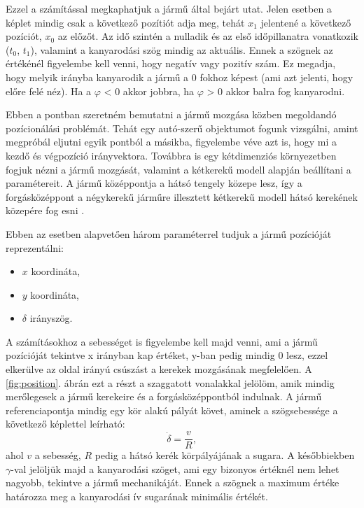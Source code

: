 Ezzel a számítással megkaphatjuk a jármű által bejárt utat. Jelen esetben a képlet mindig csak a következő pozítiót adja meg, tehát $x_1$ jelentené a következő pozíciót, $x_0$ az előzőt. Az idő szintén a nulladik és az első időpillanatra vonatkozik ($t_0$, $t_1$), valamint a kanyarodási szög mindig az aktuális. Ennek a szögnek az értékénél figyelembe kell venni, hogy negatív vagy pozitív szám. Ez megadja, hogy melyik irányba kanyarodik a jármű a 0 fokhoz képest (ami azt jelenti, hogy előre felé néz). Ha a $\varphi$ < 0 akkor jobbra, ha $\varphi$ > 0  akkor balra fog kanyarodni.


Ebben a pontban szeretném bemutatni a jármű mozgása közben megoldandó pozícionálási problémát. Tehát egy autó-szerű objektumot fogunk vizsgálni, amint megpróbál eljutni egyik pontból a másikba, figyelembe véve azt is, hogy mi a kezdő és végpozíció irányvektora. Továbbra is egy kétdimenziós környezetben fogjuk nézni a jármű mozgását, valamint a kétkerekű modell alapján beállítani a paramétereit. A jármű középpontja a hátsó tengely közepe lesz, így a forgásközéppont a négykerekű járműre illesztett kétkerekű modell hátsó kerekének közepére fog esni \cite{jazar2014steering,maalouf2006higher}.

Ebben az esetben alapvetően három paraméterrel tudjuk a jármű pozícióját reprezentálni:
\begin{itemize}
	\item $x$ koordináta,
	\item $y$ koordináta,
	\item $\delta$ irányszög.
\end{itemize}
A számításokhoz a sebességet is figyelembe kell majd venni, ami a jármű pozícióját tekintve x irányban kap értéket, y-ban pedig mindig 0 lesz, ezzel elkerülve az oldal irányú csúszást a kerekek mozgásának megfelelően. A \ref{fig:position}. ábrán ezt a részt a szaggatott vonalakkal jelölöm, amik mindig merőlegesek a jármű kerekeire és a forgásközéppontból indulnak. A jármű referenciapontja mindig egy kör alakú pályát követ, aminek a szögsebessége a következő képlettel leírható:
\[
\dot{\delta} = \dfrac{v}{R},
\]
ahol $v$ a sebesség, $R$ pedig a hátsó kerék körpályájának a sugara. A későbbiekben $\gamma$-val jelöljük majd a kanyarodási szöget, ami egy bizonyos értéknél nem lehet nagyobb, tekintve a jármű mechanikáját. Ennek a szögnek a maximum értéke határozza meg a kanyarodási ív sugarának minimális értékét.


